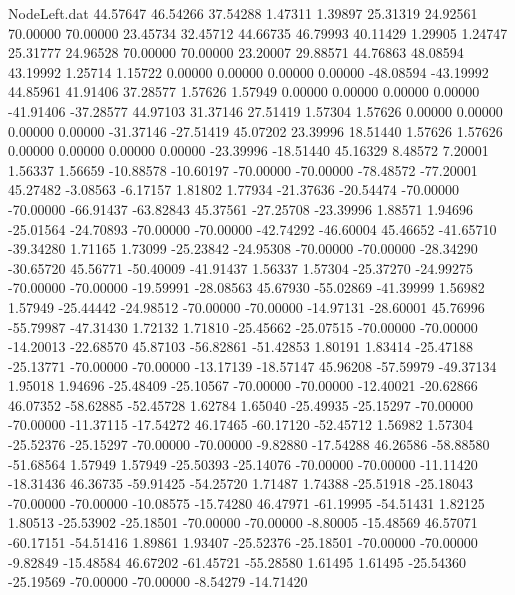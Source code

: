 \begin{filecontents}{NodeLeft.dat}
  44.57647   46.54266   37.54288     1.47311    1.39897   25.31319   24.92561   70.00000   70.00000   23.45734   32.45712
  44.66735   46.79993   40.11429     1.29905    1.24747   25.31777   24.96528   70.00000   70.00000   23.20007   29.88571
  44.76863   48.08594   43.19992     1.25714    1.15722    0.00000    0.00000    0.00000    0.00000  -48.08594  -43.19992
  44.85961   41.91406   37.28577     1.57626    1.57949    0.00000    0.00000    0.00000    0.00000  -41.91406  -37.28577
  44.97103   31.37146   27.51419     1.57304    1.57626    0.00000    0.00000    0.00000    0.00000  -31.37146  -27.51419
  45.07202   23.39996   18.51440     1.57626    1.57626    0.00000    0.00000    0.00000    0.00000  -23.39996  -18.51440
  45.16329    8.48572    7.20001     1.56337    1.56659  -10.88578  -10.60197  -70.00000  -70.00000  -78.48572  -77.20001
  45.27482   -3.08563   -6.17157     1.81802    1.77934  -21.37636  -20.54474  -70.00000  -70.00000  -66.91437  -63.82843
  45.37561  -27.25708  -23.39996     1.88571    1.94696  -25.01564  -24.70893  -70.00000  -70.00000  -42.74292  -46.60004
  45.46652  -41.65710  -39.34280     1.71165    1.73099  -25.23842  -24.95308  -70.00000  -70.00000  -28.34290  -30.65720
  45.56771  -50.40009  -41.91437     1.56337    1.57304  -25.37270  -24.99275  -70.00000  -70.00000  -19.59991  -28.08563
  45.67930  -55.02869  -41.39999     1.56982    1.57949  -25.44442  -24.98512  -70.00000  -70.00000  -14.97131  -28.60001
  45.76996  -55.79987  -47.31430     1.72132    1.71810  -25.45662  -25.07515  -70.00000  -70.00000  -14.20013  -22.68570
  45.87103  -56.82861  -51.42853     1.80191    1.83414  -25.47188  -25.13771  -70.00000  -70.00000  -13.17139  -18.57147
  45.96208  -57.59979  -49.37134     1.95018    1.94696  -25.48409  -25.10567  -70.00000  -70.00000  -12.40021  -20.62866
  46.07352  -58.62885  -52.45728     1.62784    1.65040  -25.49935  -25.15297  -70.00000  -70.00000  -11.37115  -17.54272
  46.17465  -60.17120  -52.45712     1.56982    1.57304  -25.52376  -25.15297  -70.00000  -70.00000   -9.82880  -17.54288
  46.26586  -58.88580  -51.68564     1.57949    1.57949  -25.50393  -25.14076  -70.00000  -70.00000  -11.11420  -18.31436
  46.36735  -59.91425  -54.25720     1.71487    1.74388  -25.51918  -25.18043  -70.00000  -70.00000  -10.08575  -15.74280
  46.47971  -61.19995  -54.51431     1.82125    1.80513  -25.53902  -25.18501  -70.00000  -70.00000   -8.80005  -15.48569
  46.57071  -60.17151  -54.51416     1.89861    1.93407  -25.52376  -25.18501  -70.00000  -70.00000   -9.82849  -15.48584
  46.67202  -61.45721  -55.28580     1.61495    1.61495  -25.54360  -25.19569  -70.00000  -70.00000   -8.54279  -14.71420

\end{filecontents}
